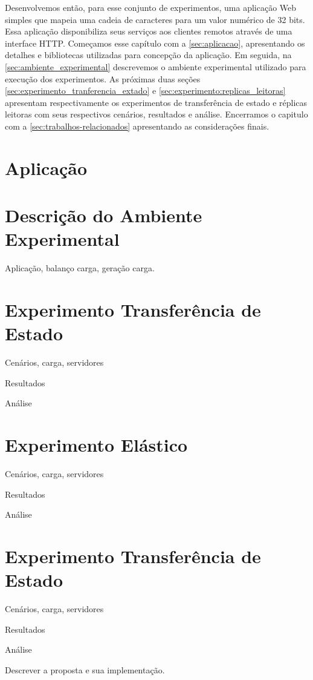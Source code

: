 Desenvolvemos então, para esse conjunto de experimentos, uma aplicação Web simples que
mapeia uma cadeia de caracteres para um valor numérico de 32 bits. Essa aplicação
disponibiliza seus serviços aos clientes remotos através de uma interface HTTP. Começamos
esse capítulo com a \autoref{sec:aplicacao}, apresentando os detalhes e bibliotecas
utilizadas para concepção da aplicação. Em seguida, na \autoref{sec:ambiente_experimental}
descrevemos o ambiente experimental utilizado para execução dos experimentos. As próximas
duas seções \autoref{sec:experimento_tranferencia_extado} e
\autoref{sec:experimento:replicas_leitoras} apresentam respectivamente os experimentos de
transferência de estado e réplicas leitoras com seus respectivos cenários, resultados e
análise. Encerramos o capitulo com a \autoref{sec:trabalhos-relacionados} apresentando as
considerações finais.

\section{Aplicação}\label{aplicacao}


\section{Descrição do Ambiente Experimental}\label{sec:ambiente_experimental}

Aplicação, balanço carga, geração carga.

\section{Experimento Transferência de Estado}\label{sec:experimento_tranferencia_estado}

Cenários, carga, servidores

Resultados

Análise

\section{Experimento Elástico}\label{sec:experimento:replicas_leitoras}

Cenários, carga, servidores

Resultados

Análise

\section{Experimento Transferência de Estado}

Cenários, carga, servidores

Resultados

Análise


Descrever a proposta e sua implementação.

